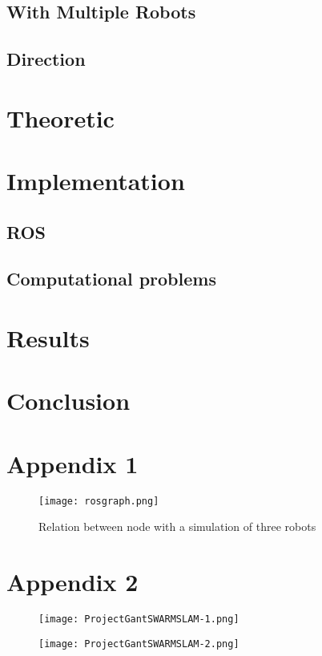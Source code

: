 \documentclass[12pt]{report} %
\begin{document}
\section{With Multiple Robots}

\section{Direction}


\chapter{Theoretic}

\chapter{Implementation}
\section{ROS}

\section{Computational problems}

\chapter{Results}\label{ch:results}

\chapter*{Conclusion}

\chapter{Appendix 1}

\begin{figure}[H]
\centering
\texttt{[image: rosgraph.png]}
\caption{Relation between node with a simulation of three robots}
\label{fig:completeNode}
\end{figure}

\chapter{Appendix 2}
\begin{figure}[H]
\centering
\texttt{[image: ProjectGantSWARMSLAM-1.png]}
\end{figure}
\begin{figure}[H]
\centering
\texttt{[image: ProjectGantSWARMSLAM-2.png]}
\end{figure}
\end{document}
